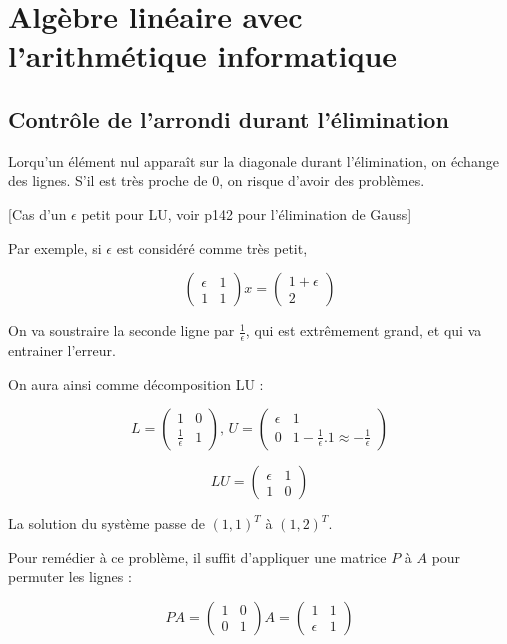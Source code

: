 	

\section{Algèbre linéaire avec l'arithmétique informatique}

	\subsection{Contrôle de l'arrondi durant l'élimination}
	
	Lorqu'un élément nul apparaît sur la diagonale durant l'élimination, on échange des lignes. S'il est très proche de 0, on risque d'avoir des problèmes.
	
	[Cas d'un $\epsilon$ petit pour LU, voir p142 pour l'élimination de Gauss]
	
	Par exemple, si $\epsilon$ est considéré comme très petit,
	
	$$\begin{pmatrix}
\epsilon & 1 \\ 
1 & 1
\end{pmatrix} x = \begin{pmatrix}
1 + \epsilon \\ 
2
\end{pmatrix}  $$

	On va soustraire la seconde ligne par $\frac{1}{\epsilon}$, qui est extrêmement grand, et qui va entrainer l'erreur.
	
	On aura ainsi comme décomposition LU :
	
	$$L = \begin{pmatrix}
1 & 0 \\ 
\frac{1}{\epsilon} & 1
\end{pmatrix} \text{, } U = \begin{pmatrix}
\epsilon & 1 \\ 
0 & 1 - \frac{1}{\epsilon}.1 \approx - \frac{1}{\epsilon}
\end{pmatrix} $$

$$LU = \begin{pmatrix}
\epsilon & 1 \\ 
1 & 0
\end{pmatrix} $$

	La solution du système passe de $(1, 1)^T$ à $(1, 2)^T$.

	Pour remédier à ce problème, il suffit d'appliquer une matrice $P$ à $A$ pour permuter les lignes :

$$PA = \begin{pmatrix}
1 & 0 \\ 
0 & 1
\end{pmatrix} A = \begin{pmatrix}
1 & 1 \\ 
\epsilon & 1
\end{pmatrix} $$

